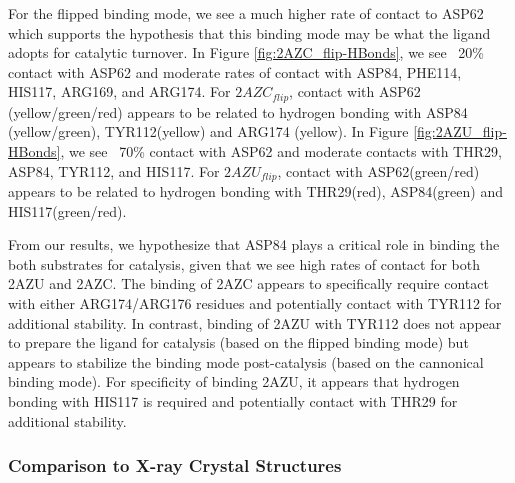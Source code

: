 \documentclass[fleqn,10pt]{wlscirep}
\begin{document}
For the flipped binding mode, we see a much higher rate of contact to ASP62 which supports the hypothesis that this binding mode may be what the ligand adopts for catalytic turnover.
In Figure \ref{fig:2AZC_flip-HBonds}, we see ~20\% contact with ASP62 and moderate rates of contact with ASP84, PHE114, HIS117, ARG169, and ARG174.
For $2AZC_{flip}$, contact with ASP62 (yellow/green/red) appears to be related to hydrogen bonding with ASP84 (yellow/green), TYR112(yellow) and ARG174 (yellow).
In Figure \ref{fig:2AZU_flip-HBonds}, we see ~70\% contact with ASP62 and moderate contacts with THR29, ASP84, TYR112, and HIS117.
For $2AZU_{flip}$, contact with ASP62(green/red) appears to be related to hydrogen bonding with THR29(red), ASP84(green) and HIS117(green/red).

From our results, we hypothesize that ASP84 plays a critical role in binding the both substrates for catalysis, given that we see high rates of contact for both 2AZU and 2AZC.
The binding of 2AZC appears to specifically require contact with either ARG174/ARG176 residues and potentially contact with TYR112 for additional stability.
In contrast, binding of 2AZU with TYR112 does not appear to prepare the ligand for catalysis (based on the flipped binding mode) but appears to stabilize the binding mode post-catalysis (based on the cannonical binding mode).
For specificity of binding 2AZU, it appears that hydrogen bonding with HIS117 is required and potentially contact with THR29 for additional stability.

\subsubsection{Comparison to X-ray Crystal Structures}
\end{document}
